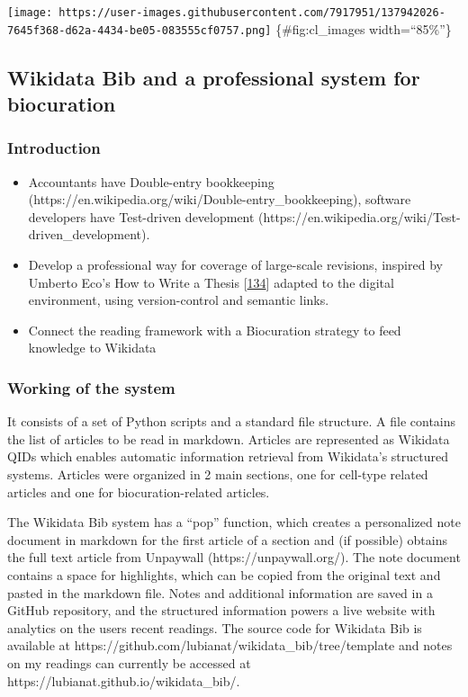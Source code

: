 \texttt{[image: https://user-images.githubusercontent.com/7917951/137942026-7645f368-d62a-4434-be05-083555cf0757.png]} \{\#fig:cl\_images width=``85\%''\}

\hypertarget{wikidata-bib-and-a-professional-system-for-biocuration}{%
\subsection{Wikidata Bib and a professional system for biocuration}\label{wikidata-bib-and-a-professional-system-for-biocuration}}

\hypertarget{introduction-3}{%
\subsubsection{Introduction}\label{introduction-3}}

\begin{itemize}
\item
  Accountants have Double-entry bookkeeping (https://en.wikipedia.org/wiki/Double-entry\_bookkeeping), software developers have Test-driven development (https://en.wikipedia.org/wiki/Test-driven\_development).
\item
  Develop a professional way for coverage of large-scale revisions, inspired by Umberto Eco's How to Write a Thesis {[}\protect\hyperlink{ref-1HBVPtZGp}{134}{]} adapted to the digital environment, using version-control and semantic links.
\item
  Connect the reading framework with a Biocuration strategy to feed knowledge to Wikidata
\end{itemize}

\hypertarget{working-of-the-system}{%
\subsubsection{Working of the system}\label{working-of-the-system}}

It consists of a set of Python scripts and a standard file structure. A file contains the list of articles to be read in markdown. Articles are represented as Wikidata QIDs which enables automatic information retrieval from Wikidata's structured systems. Articles were organized in 2 main sections, one for cell-type related articles and one for biocuration-related articles.

The Wikidata Bib system has a ``pop'' function, which creates a personalized note document in markdown for the first article of a section and (if possible) obtains the full text article from Unpaywall (https://unpaywall.org/). The note document contains a space for highlights, which can be copied from the original text and pasted in the markdown file.
Notes and additional information are saved in a GitHub repository, and the structured information powers a live website with analytics on the users recent readings. The source code for Wikidata Bib is available at https://github.com/lubianat/wikidata\_bib/tree/template and notes on my readings can currently be accessed at https://lubianat.github.io/wikidata\_bib/.

